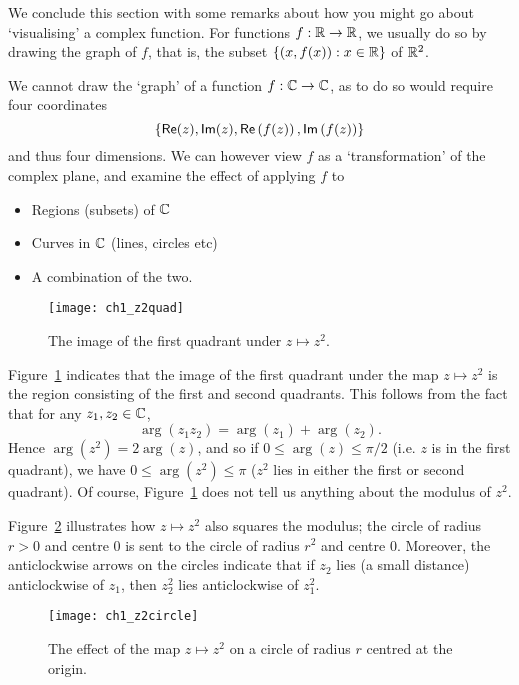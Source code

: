 \begin{full}
\begin{remark}
We conclude this section with some remarks about how you might go about `visualising' a complex function.  For functions $f:\mathbb{R} \to \mathbb{R}$, we usually do so by drawing the graph of $f$, that is, the subset $\left\{(x,f(x)): x \in \mathbb{R}\right\}$ of $\mathbb{R}^2$.

We cannot draw the `graph' of a function $f:\mathbb{C} \to \mathbb{C}$, as to do so would require four coordinates
\[
\left\{ \textsf{Re} (z), \textsf{Im} (z) , \textsf{Re} \left( f(z) \right), \textsf{Im} \left( f(z) \right) \right\}
\]
and thus four dimensions.  We can however view $f$ as a `transformation' of the complex plane, and examine the effect of applying $f$ to
\begin{itemize}
\item Regions (subsets) of $\mathbb{C}$
\item Curves in $\mathbb{C}$ (lines, circles etc)
\item A combination of the two.
\end{itemize}


\begin{figure}[H]
\centering
\texttt{[image: ch1\_z2quad]}
\caption{The image of the first quadrant under $z \mapsto z^2$.}
\label{f:z2}
\end{figure}
Figure~\ref{f:z2} indicates that the image of the first quadrant under the map $z \mapsto z^2$ is the region consisting of the first and second quadrants.  This follows from the fact that for any $z_1,z_2 \in \mathbb{C}$, 
\[
\arg (z_1z_2)=\arg(z_1)+\arg(z_2).
\]
Hence $\arg(z^2)=2\arg(z)$, and so if $0 \leq \arg (z) \leq \pi/2$ (i.e. $z$ is in the first quadrant), we have $0 \leq \arg (z^2) \leq \pi$ ($z^2$ lies in either the first or second quadrant).  Of course, Figure~\ref{f:z2} does not tell us anything about the modulus of $z^2$.


Figure~\ref{f:z2c} illustrates how $z \mapsto z^2$ also squares the modulus; the circle of radius $r>0$ and centre $0$ is sent to the circle of radius $r^2$ and centre $0$.  Moreover, the anticlockwise arrows on the circles indicate that if $z_2$ lies (a small distance) anticlockwise of $z_1$, then $z_2^2$ lies anticlockwise of $z_1^2$.





\begin{figure}[H]
\centering
\texttt{[image: ch1\_z2circle]}
\caption{The effect of the map $z \mapsto z^2$ on a circle of radius $r$ centred at the origin.}
\label{f:z2c}
\end{figure}


\end{remark}
\end{full}
